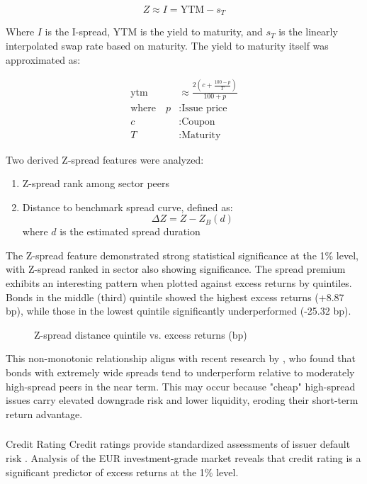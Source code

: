 $$Z \approx I = \text{YTM} - s_T$$

Where $I$ is the I-spread, YTM is the yield to maturity, and $s_T$ is the linearly interpolated swap rate based on maturity. The yield to maturity itself was approximated as:

\begin{align}
\text{ytm} &\approx \frac{2(c+ \frac{100-p}{T})}{100+p} \\
\text{where} \quad p &: \text{Issue price} \nonumber\\
c &: \text{Coupon} \nonumber\\
T &: \text{Maturity} \nonumber
\end{align}

Two derived Z-spread features were analyzed:

\begin{enumerate}
    \item Z-spread rank among sector peers
    \item Distance to benchmark spread curve, defined as:
    $$\Delta Z = Z - Z_B(d)$$
    where $d$ is the estimated spread duration
\end{enumerate}

The Z-spread feature demonstrated strong statistical significance at the 1\% level, with Z-spread ranked in sector also showing significance. The spread premium exhibits an interesting pattern when plotted against excess returns by quintiles. Bonds in the middle (third) quintile showed the highest excess returns (+8.87 bp), while those in the lowest quintile significantly underperformed (-25.32 bp).

\begin{figure}[h]
    \begin{center}
        
    \end{center}
    \caption{Z-spread distance quintile vs. excess returns (bp)}
    \label{fig:data_availability}
\end{figure}

This non-monotonic relationship aligns with recent research by \textcite{Dickerson2024Factor}, who found that bonds with extremely wide spreads tend to underperform relative to moderately high-spread peers in the near term. This may occur because "cheap" high-spread issues carry elevated downgrade risk and lower liquidity, eroding their short-term return advantage.

\subsubsection{}{Credit Rating}
Credit ratings provide standardized assessments of issuer default risk \parencite[pp. 26 - 28]{Fabozzi2021TheEdition}. Analysis of the EUR investment-grade market reveals that credit rating is a significant predictor of excess returns at the 1\% level.


